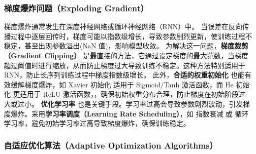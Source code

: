 \subsubsection{梯度爆炸问题（Exploding Gradient）}


梯度爆炸通常发生在深度神经网络或循环神经网络（RNN）中。
当误差在反向传播过程中逐层回传时，梯度可能以指数级增长，导致参数剧烈更新，使训练过程不稳定，甚至出现参数溢出(NaN 值)，影响模型收敛。
为解决这一问题，{\bf 梯度裁剪（Gradient Clipping）} 是最直接的方法，它通过设定梯度的最大范数，当梯度超过阈值时进行缩放，从而防止梯度过大导致训练不稳定。这种方法特别适用于 RNN，防止长序列训练过程中梯度指数级增长。
此外，{\bf 合适的权重初始化} 也能有效缓解梯度爆炸，如 Xavier 初始化 适用于 Sigmoid/Tanh 激活函数，而 He 初始化 更适用于 ReLU 激活函数，，确保初始权重分布合理，防止梯度在初始阶段过大或过小。
{\bf 优化学习率} 也是关键手段。学习率过高会导致参数剧烈波动，引发梯度爆炸。采用{\bf 学习率调度（Learning Rate Scheduling）}，如 指数衰减 或 循环学习率，避免初始学习率过高导致梯度爆炸，确保训练稳定。

\subsubsection{ 自适应优化算法（Adaptive Optimization Algorithms）}


